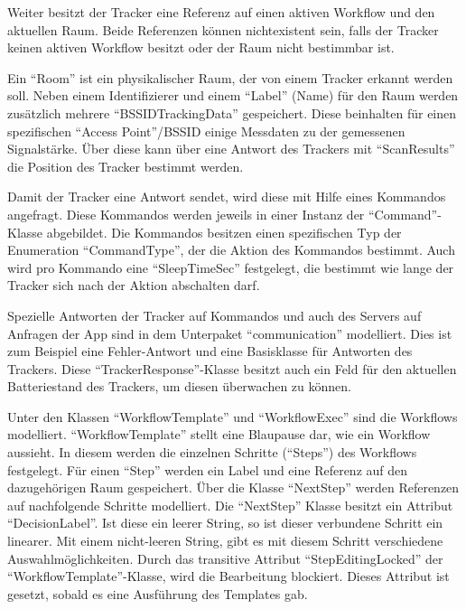 Weiter besitzt der Tracker eine Referenz auf einen aktiven Workflow und den aktuellen Raum.
Beide Referenzen können nichtexistent sein, falls der Tracker keinen aktiven Workflow besitzt oder der Raum nicht bestimmbar ist.

Ein \enquote{Room} ist ein physikalischer Raum, der von einem Tracker erkannt werden soll.
Neben einem Identifizierer und einem \enquote{Label} (Name) für den Raum werden zusätzlich mehrere \enquote{BSSIDTrackingData} gespeichert.
Diese beinhalten für einen spezifischen \enquote{Access Point}/\gls{BSSID} einige Messdaten zu der gemessenen Signalstärke.
Über diese kann über eine Antwort des Trackers mit \enquote{ScanResults} die Position des Tracker bestimmt werden.

Damit der Tracker eine Antwort sendet, wird diese mit Hilfe eines Kommandos angefragt.
Diese Kommandos werden jeweils in einer Instanz der \enquote{Command}-Klasse abgebildet.
Die Kommandos besitzen einen spezifischen Typ der Enumeration \enquote{CommandType}, der die Aktion des Kommandos bestimmt.
Auch wird pro Kommando eine \enquote{SleepTimeSec} festgelegt, die bestimmt wie lange der Tracker sich nach der Aktion abschalten darf.

Spezielle Antworten der Tracker auf Kommandos und auch des Servers auf Anfragen der App sind in dem Unterpaket \enquote{communication} modelliert.
Dies ist zum Beispiel eine Fehler-Antwort und eine Basisklasse für Antworten des Trackers.
Diese \enquote{TrackerResponse}-Klasse besitzt auch ein Feld für den aktuellen Batteriestand des Trackers, um diesen überwachen zu können.

Unter den Klassen \enquote{WorkflowTemplate} und \enquote{WorkflowExec} sind die Workflows modelliert.
\enquote{WorkflowTemplate} stellt eine Blaupause dar, wie ein Workflow aussieht.
In diesem werden die einzelnen Schritte (\enquote{Steps}) des Workflows festgelegt.
Für einen \enquote{Step} werden ein Label und eine Referenz auf den dazugehörigen Raum gespeichert.
Über die Klasse \enquote{NextStep} werden Referenzen auf nachfolgende Schritte modelliert.
Die \enquote{NextStep} Klasse besitzt ein Attribut \enquote{DecisionLabel}.
Ist diese ein leerer String, so ist dieser verbundene Schritt ein linearer.
Mit einem nicht-leeren String, gibt es mit diesem Schritt verschiedene Auswahlmöglichkeiten.
Durch das transitive Attribut \enquote{StepEditingLocked} der \enquote{WorkflowTemplate}-Klasse, wird die Bearbeitung blockiert.
Dieses Attribut ist gesetzt, sobald es eine Ausführung des Templates gab.

